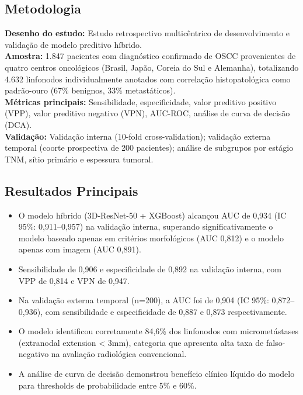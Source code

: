 \subsection{Metodologia}
\textbf{Desenho do estudo:} Estudo retrospectivo multicêntrico de
desenvolvimento e validação de modelo preditivo híbrido. \\
\textbf{Amostra:} 1.847 pacientes com diagnóstico confirmado de OSCC
provenientes de quatro centros oncológicos (Brasil, Japão, Coreia do Sul
e Alemanha), totalizando 4.632 linfonodos individualmente anotados com
correlação histopatológica como padrão-ouro (67\% benignos, 33\%
metastáticos). \\
\textbf{Métricas principais:} Sensibilidade, especificidade, valor
preditivo positivo (VPP), valor preditivo negativo (VPN), AUC-ROC,
análise de curva de decisão (DCA). \\
\textbf{Validação:} Validação interna (10-fold cross-validation);
validação externa temporal (coorte prospectiva de 200 pacientes); análise
de subgrupos por estágio TNM, sítio primário e espessura tumoral.

\subsection{Resultados Principais}
\begin{itemize}
  \item O modelo híbrido (3D-ResNet-50 + XGBoost) alcançou AUC de 0,934
        (IC 95\%: 0,911--0,957) na validação interna, superando
        significativamente o modelo baseado apenas em critérios
        morfológicos (AUC 0,812) e o modelo apenas com imagem (AUC 0,891).
  \item Sensibilidade de 0,906 e especificidade de 0,892 na validação
        interna, com VPP de 0,814 e VPN de 0,947.
  \item Na validação externa temporal (n=200), a AUC foi de 0,904
        (IC 95\%: 0,872--0,936), com sensibilidade e especificidade de
        0,887 e 0,873 respectivamente.
  \item O modelo identificou corretamente 84,6\% dos linfonodos com
        micrometástases (extranodal extension < 3mm), categoria que
        apresenta alta taxa de falso-negativo na avaliação radiológica
        convencional.
  \item A análise de curva de decisão demonstrou benefício clínico líquido
        do modelo para thresholds de probabilidade entre 5\% e 60\%.
\end{itemize}

